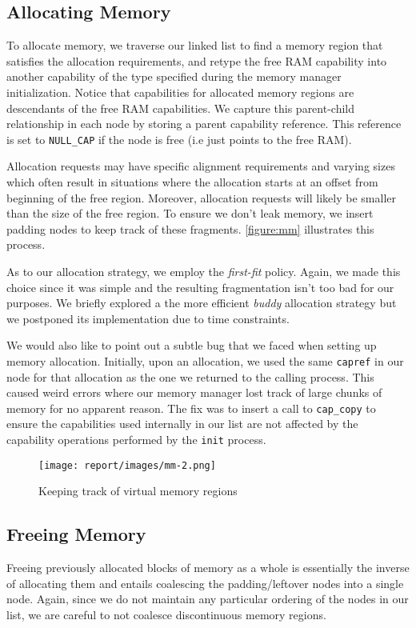 \subsection*{Allocating Memory}
To allocate memory, we traverse our linked list to find a memory region that satisfies the allocation requirements, and retype the free RAM capability into another capability of the type specified during the memory manager initialization. Notice that capabilities for allocated memory regions are descendants of the free RAM capabilities. We capture this parent-child relationship in each node by storing a parent capability reference. This reference is set to \verb|NULL_CAP| if the node is free (i.e just points to the free RAM).

Allocation requests may have specific alignment requirements and varying sizes which often result in situations where the allocation starts at an offset from beginning of the free region. Moreover, allocation requests will likely be smaller than the size of the free region. To ensure we don't leak memory, we insert padding nodes to keep track of these fragments. \autoref{figure:mm} illustrates this process.

As to our allocation strategy, we employ the \textit{first-fit} policy. Again, we made this choice since it was simple and the resulting fragmentation isn't too bad for our purposes. We briefly explored a the more efficient \textit{buddy} allocation strategy but we postponed its implementation due to time constraints.

We would also like to point out a subtle bug that we faced when setting up memory allocation. Initially, upon an allocation, we used the same \verb|capref| in our node for that allocation as the one we returned to the calling process. This caused weird errors where our memory manager lost track of large chunks of memory for no apparent reason. The fix was to insert a call to \verb|cap_copy| to ensure the capabilities used internally in our list are not affected by the capability operations performed by the \verb|init| process.

\begin{figure}[h]
	\texttt{[image: report/images/mm-2.png]}
	\caption{Keeping track of virtual memory regions}
	\label{figure:mm}
	\centering
\end{figure}

\subsection*{Freeing Memory}
Freeing previously allocated blocks of memory as a whole is essentially the inverse of allocating them and entails coalescing the padding/leftover nodes into a single node. Again, since we do not maintain any particular ordering of the nodes in our list, we are careful to not coalesce discontinuous memory regions.

